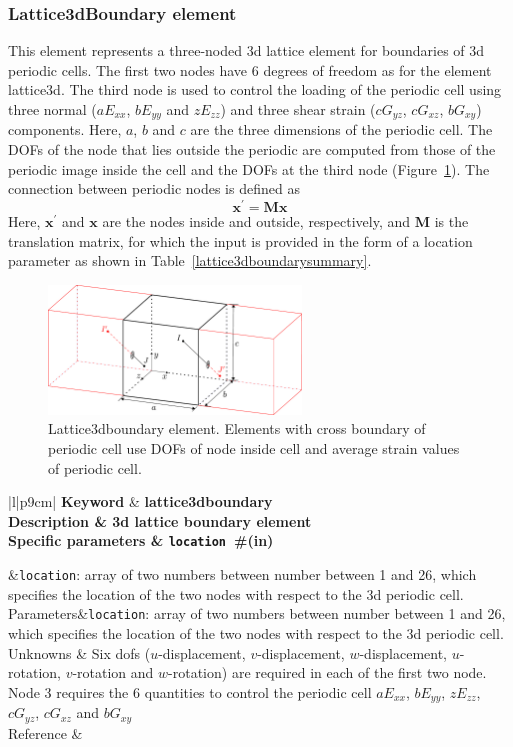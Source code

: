 \documentclass[a4paper]{article}
\newcommand{\param}[1]{\texttt{#1}} %
\newcommand{\field}[2]{\param{#1}~\#{\tiny(#2)}} %
\newcommand{\templabel}{}%
\newcommand{\tempcaption}{}%
\newcounter{nelpar}
\newenvironment{elementsummary}[5]{%
  \gdef\tempcaption{#4}%
  \gdef\templabel{#5}%
  \setcounter{nelpar}{0}%
  \begin{center} %
    \begin{table}[!htb] %
      \begin{tabular}{|l|p{9cm}|}\hline %
        {\bf Keyword} & \bf{#1}\\ %
        {Description} & {#2}\\ %
        {Specific parameters} & {#3}\\ \hline %
}{
  \\ \hline %
      \end{tabular}%
      \caption{\tempcaption}%
      \label{\templabel}%
    \end{table}%
  \end{center}%
}
\newcommand{\elementParam}[1]{%
  \ifthenelse{\value{nelpar}>0} %
             {&{#1}}%
             {\setcounter{nelpar}{1}Parameters&{#1}}%
             \\%
}
\newcommand{\elementDescription}[2]{{#1} & {#2}\\}
\begin{document}
\subsubsection{Lattice3dBoundary element}
This element represents a three-noded 3d lattice element for boundaries of 3d periodic cells. The first two nodes have 6 degrees of freedom as for the element lattice3d. The third node is used to control the loading of the periodic cell using three normal ($aE_{xx}$, $bE_{yy}$ and $zE_{zz}$) and three shear strain ($cG_{yz}$, $cG_{xz}$, $bG_{xy}$) components. Here, $a$, $b$ and $c$ are the three dimensions of the periodic cell. The DOFs of the node that lies outside the periodic are computed from those of the periodic image inside the cell and the DOFs at the third node (Figure~\ref{lattice3dboundaryfig}). The connection between periodic nodes is defined as
\begin{equation}
  \mathbf{x}^{'} = \mathbf{M} \mathbf{x}
\end{equation}
Here, $\mathbf{x}^{'}$ and $\mathbf{x}$ are the nodes inside and outside, respectively, and $\mathbf{M}$ is the translation matrix, for which the input is provided in the form of a location parameter as shown in Table~\ref{lattice3dboundarysummary}. 

\begin{figure}[htb]
  \centering
  \includegraphics[width=0.6\textwidth]{./lattice3dboundaryfig.pdf}
 \caption{Lattice3dboundary element. Elements with cross boundary of periodic cell use DOFs of node inside cell and average strain values of periodic cell.}
 \label{lattice3dboundaryfig}
\end{figure}

\begin{elementsummary}{lattice3dboundary}{3d lattice boundary element}{\field{location}{in}}{lattice3dboundary element summary}{lattice3dboundarysummary}
\elementParam{\param{location}: array of two numbers between number between 1 and 26, which specifies the location of the two nodes with respect to the 3d periodic cell.}
\elementDescription{Unknowns}{Six dofs ($u$-displacement, $v$-displacement, $w$-displacement, $u$-rotation, $v$-rotation and $w$-rotation) are required in each of the first two node. Node 3 requires the 6 quantities to control the periodic cell $aE_{xx}$, $bE_{yy}$, $zE_{zz}$, $cG_{yz}$, $cG_{xz}$ and $bG_{xy}$ }
\elementDescription{Reference}{\cite{AthWheGra18}}
\end{elementsummary}
\end{document}
